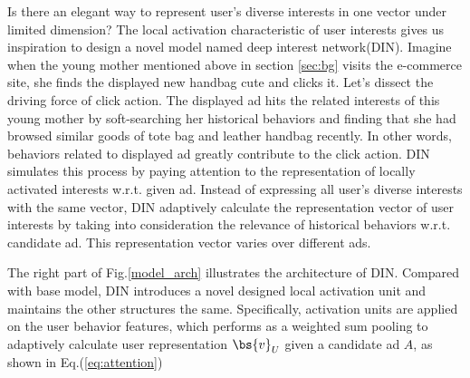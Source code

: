 
Is there an elegant way to represent user's diverse interests in one vector under limited dimension?
The local activation characteristic of user interests gives us inspiration to design a novel model named deep interest network(DIN).
Imagine when the young mother mentioned above in section \ref{sec:bg} visits the e-commerce site, she finds the displayed new handbag cute and clicks it.
Let's dissect the driving force of click action. 
The displayed ad hits the related interests of this young mother by soft-searching her historical behaviors and finding that she had browsed similar goods of tote bag and leather handbag recently.  
In other words, behaviors related to displayed ad greatly contribute to the click action.  
DIN simulates this process by paying attention to the representation of locally activated interests w.r.t. given ad.
Instead of expressing all user's diverse interests with the same vector, DIN adaptively calculate the representation vector of user interests by taking into consideration the relevance of historical behaviors w.r.t. candidate ad.
This representation vector varies over different ads.         

The right part of Fig.\ref{model_arch} illustrates the architecture of DIN. 
Compared with base model, DIN introduces a novel designed local activation unit and maintains the other structures the same.  Specifically, activation units are applied on the user behavior features, which performs as a weighted sum pooling to adaptively calculate user representation $\bs{v}_U$ given a candidate ad $A$, as shown in Eq.(\ref{eq:attention})


